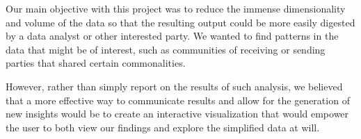 Our main objective with this project was to reduce the immense dimensionality and volume of the data so that the resulting output could be more easily digested by a data analyst or other interested party. 
We wanted to find patterns in the data that might be of interest, such as communities of receiving or sending parties that shared certain commonalities. 

However, rather than simply report on the results of such analysis, we believed that a more effective way to communicate results and allow for the generation of new insights would be to create an interactive visualization that would empower the user to both view our findings and explore the simplified data at will.
